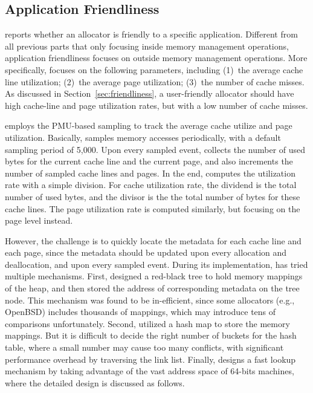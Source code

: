 \subsection{Application Friendliness}
\label{sec:profilefriendliness}

\MP{} reports whether an allocator is friendly to a specific application. Different from all previous parts that only focusing inside memory management operations, application friendliness focuses on outside memory management operations. More specifically, \MP{} focuses on the following parameters, including (1)~the average cache line utilization; (2)~the average page utilization; (3)~the number of cache misses. As discussed in Section~\ref{sec:friendliness}, a user-friendly allocator should have high cache-line and page utilization rates, but with a low number of cache misses.  

\MP{} employs the PMU-based sampling to track the average cache utilize and page utilization. Basically, \MP{} samples memory accesses periodically, with a default sampling period of 5,000. Upon every sampled event, \MP{} collects the number of used bytes for the current cache line and the current page, and also increments the number of sampled cache lines and pages. In the end, \MP{} computes the utilization rate with a simple division. For cache utilization rate, the dividend is the total number of used bytes, and the divisor is the the total number of bytes for these cache lines. The page utilization rate is computed similarly, but focusing on the page level instead. 

However, the challenge is to quickly locate the  metadata for each cache line and each page, since the metadata should be updated upon every allocation and deallocation, and upon every sampled event. During its implementation, \MP{} has tried multiple mechanisms. First, \MP{} designed a red-black tree to hold memory mappings of the heap, and then stored the address of corresponding metadata on the tree node. This mechanism was found to be in-efficient, since some allocators (e.g., OpenBSD) includes thousands of mappings, which may introduce tens of comparisons unfortunately. Second, \MP{} utilized a hash map to store the memory mappings. But it is difficult to decide the right number of buckets for the hash table, where a small number may cause too many conflicts, with significant performance overhead by traversing the link list.  Finally, \MP{} designs a fast lookup mechanism by taking advantage of the vast address space of 64-bits machines, where the detailed design is discussed as follows. 

